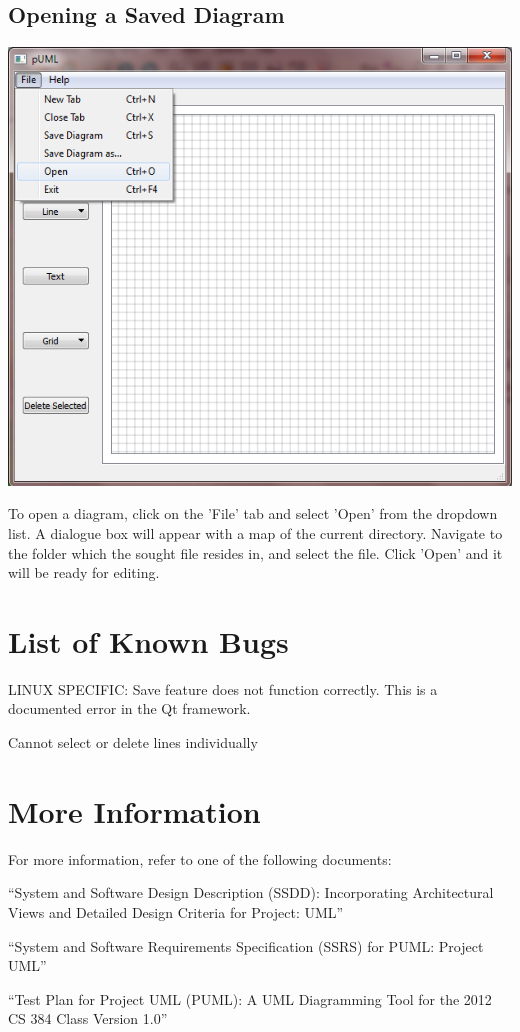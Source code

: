 \documentclass[]{article}
\begin{document}
\subsection{Opening a Saved Diagram}
{\color{black}
\includegraphics[scale = .50]{Open}

To open a diagram, click on the 'File' tab and select 'Open' from the dropdown list. A dialogue box will appear with a map of the current directory. Navigate to the folder which the sought file resides in, and select the file. Click 'Open' and it will be ready for editing. 
}
\section{List of Known Bugs}
{\color{black} 
\begin{list}{-}{ }
\item LINUX SPECIFIC: Save feature does not function correctly. This is a documented error in the Qt framework.
\item Cannot select or delete lines individually
\end{list}
}
\section{More Information}
{\color{black}
For more information, refer to one of the following documents:
\begin{list}{-}{ }
\item ``System and Software Design Description (SSDD): Incorporating Architectural Views and Detailed Design Criteria for Project: UML''
\item ``System and Software Requirements Specification (SSRS) for PUML: Project UML''
\item ``Test Plan for Project UML (PUML): A UML Diagramming Tool for the 2012 CS 384 Class Version 1.0''
\end{list}
}
\end{document}
